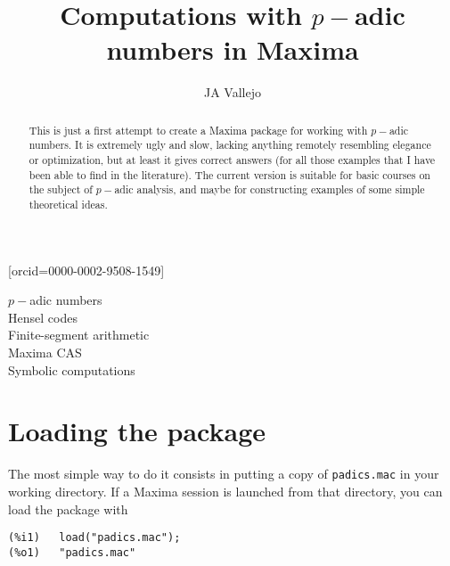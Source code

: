 \documentclass[fleqn]{cas-sc}
\begin{document}
\let\WriteBookmarks\relax
\def\floatpagepagefraction{1}
\def\textpagefraction{.001}

\title[mode=title]{Computations with $p-$adic numbers in Maxima}                      


\author[1]{JA Vallejo}[orcid=0000-0002-9508-1549]
\cormark[1]
\fnmark[1]
\address[1]{Facultad de Ciencias, Universidad Aut\'onoma de San Luis Potos\'i,\\
Av Chapultepec 1570 Col. Lomas del Pedregal\\
CP 78295 San Luis Potos\'i (SLP) M\'exico}





\begin{abstract}
This is just a first attempt to create a Maxima package for working with $p-$adic numbers. It is extremely ugly and slow, lacking anything remotely resembling elegance or optimization, but at least it gives correct answers (for all those examples that I have been able to find in the literature). The current version is suitable for basic courses on the subject of $p-$adic analysis, and maybe for constructing examples of some simple theoretical ideas.
\end{abstract}


\begin{keywords}
$p-$adic numbers\\
Hensel codes\\
Finite-segment arithmetic\\
Maxima CAS\\
Symbolic computations
\end{keywords}


\maketitle


\section{Loading the package}

The most simple way to do it consists in putting a copy of \texttt{padics.mac} in your working 
directory. If a Maxima session is launched from that directory, you can load the package with
\begin{verbatim}
(%i1)	load("padics.mac");
(%o1)	"padics.mac"
\end{verbatim}
\end{document}
